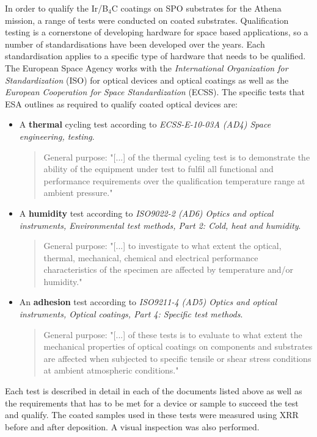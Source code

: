 In order to qualify the Ir/B$_4$C coatings on SPO substrates for the Athena mission, a range of tests were conducted on coated substrates. Qualification testing is a cornerstone of developing hardware for space based applications, so a number of standardisations have been developed over the years. Each standardisation applies to a specific type of hardware that needs to be qualified. The European Space Agency works with the \emph{International Organization for Standardization} (ISO) for optical devices and optical coatings as well as the \emph{European Cooperation for Space Standardization} (ECSS). The specific tests that ESA outlines as required to qualify coated optical devices are:

\begin{itemize}
 \item A {\bf thermal} cycling test according to \emph{ECSS-E-10-03A (AD4) Space engineering, testing}.\begin{quote}{General purpose:} "[...] of the thermal cycling test is to demonstrate the ability of the equipment under test to fulfil all functional and performance requirements over the qualification temperature range at ambient pressure."\end{quote}

 \item A {\bf humidity} test according to \emph{ISO9022-2 (AD6) Optics and optical instruments, Environmental test methods, Part 2: Cold, heat and humidity}.\begin{quote}{General purpose:} "[...] to investigate to what extent the optical, thermal, mechanical, chemical and electrical performance characteristics of the specimen are affected by temperature and/or humidity."\end{quote}

 \item An {\bf adhesion} test according to \emph{ISO9211-4 (AD5) Optics and optical instruments, Optical coatings, Part 4: Specific test methods}.
 \begin{quote}{General purpose:} "[...] of these tests is to evaluate to what extent the mechanical properties of optical coatings on components and substrates are affected when subjected to specific tensile or shear stress conditions at ambient atmospheric conditions."\end{quote}
\end{itemize}

Each test is described in detail in each of the documents listed above as well as the requirements that has to be met for a device or sample to succeed the test and qualify. The coated samples used in these tests were measured using XRR before and after deposition. A visual inspection was also performed.

